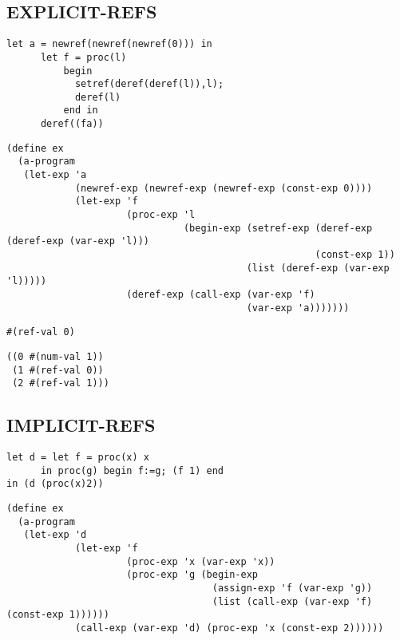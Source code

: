 \documentclass[../main.tex]{subfiles}
\begin{document}
\subsection{EXPLICIT-REFS}

\begin{lstlisting}
let a = newref(newref(newref(0))) in
      let f = proc(l)
          begin
            setref(deref(deref(l)),l);
            deref(l)
          end in
      deref((fa))
\end{lstlisting}

\begin{lstlisting}
(define ex
  (a-program
   (let-exp 'a
            (newref-exp (newref-exp (newref-exp (const-exp 0))))
            (let-exp 'f
                     (proc-exp 'l
                               (begin-exp (setref-exp (deref-exp (deref-exp (var-exp 'l)))
                                                      (const-exp 1))
                                          (list (deref-exp (var-exp 'l)))))
                     (deref-exp (call-exp (var-exp 'f)
                                          (var-exp 'a)))))))
\end{lstlisting}

\begin{lstlisting}
#(ref-val 0)
\end{lstlisting}

\begin{lstlisting}
((0 #(num-val 1))
 (1 #(ref-val 0))
 (2 #(ref-val 1)))
\end{lstlisting}

\subsection{IMPLICIT-REFS}

\begin{lstlisting}
let d = let f = proc(x) x
      in proc(g) begin f:=g; (f 1) end
in (d (proc(x)2))
\end{lstlisting}

\begin{lstlisting}
(define ex
  (a-program
   (let-exp 'd
            (let-exp 'f
                     (proc-exp 'x (var-exp 'x))
                     (proc-exp 'g (begin-exp
                                    (assign-exp 'f (var-exp 'g))
                                    (list (call-exp (var-exp 'f) (const-exp 1))))))
            (call-exp (var-exp 'd) (proc-exp 'x (const-exp 2))))))
\end{lstlisting}
\end{document}
